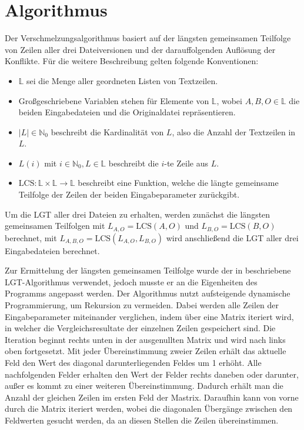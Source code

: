 \documentclass[a4paper,titlepage,12pt]{scrartcl}
\begin{document}
\section{Algorithmus}
\label{sec:algorithm}
Der Verschmelzungsalgorithmus basiert auf der längsten gemeinsamen Teilfolge von Zeilen aller drei Dateiversionen und der darauffolgenden Auflösung der Konflikte.
Für die weitere Beschreibung gelten folgende Konventionen:
\begin{itemize}
\item $\mathbb{L}$ sei die Menge aller geordneten Listen von Textzeilen.
\item Großgeschriebene Variablen stehen für Elemente von $\mathbb{L}$,
wobei $A, B, O \in \mathbb{L}$ die beiden Eingabedateien und die Originaldatei repräsentieren.
\item $|L| \in \mathbb{N}_0$ beschreibt die Kardinalität von $L$,
also die Anzahl der Textzeilen in $L$.
\item $L(i)$ mit $i \in \mathbb{N}_0, L \in \mathbb{L}$ beschreibt die $i$-te Zeile aus $L$.
\item $\mbox{LCS}: \mathbb{L} \times \mathbb{L} \rightarrow \mathbb{L}$ beschreibt eine Funktion,
welche die längte gemeinsame Teilfolge der Zeilen der beiden Eingabeparameter zurückgibt.
\end{itemize}

Um die LGT aller drei Dateien zu erhalten,
werden zunächst die längsten gemeinsamen Teilfolgen mit $L_{A,O} = \mbox{LCS}(A, O)$ und $L_{B,O} = \mbox{LCS}(B, O)$ berechnet,
mit $L_{A,B,O} = \mbox{LCS}(L_{A,O}, L_{B,O})$ wird anschließend die LGT aller drei Eingabedateien berechnet.

Zur Ermittelung der längsten gemeinsamen Teilfolge wurde der in \citet{web:eppstein} beschriebene LGT-Algorithmus verwendet,
jedoch musste er an die Eigenheiten des Programms angepasst werden.
Der Algorithmus nutzt aufsteigende dynamische Programmierung,
um Rekursion zu vermeiden.
Dabei werden alle Zeilen der Eingabeparameter miteinander verglichen,
indem über eine Matrix iteriert wird,
in welcher die Vergleichsresultate der einzelnen Zeilen gespeichert sind.
Die Iteration beginnt rechts unten in der ausgenullten Matrix und wird nach links oben fortgesetzt.
Mit jeder Übereinstimmung zweier Zeilen erhält das aktuelle Feld den Wert des diagonal darunterliegenden Feldes um 1 erhöht.
Alle nachfolgenden Felder erhalten den Wert der Felder rechts daneben oder darunter,
außer es kommt zu einer weiteren Übereinstimmung.
Dadurch erhält man die Anzahl der gleichen Zeilen im ersten Feld der Mastrix.
Daraufhin kann von vorne durch die Matrix iteriert werden,
wobei die diagonalen Übergänge zwischen den Feldwerten gesucht werden,
da an diesen Stellen die Zeilen übereinstimmen.
\end{document}
